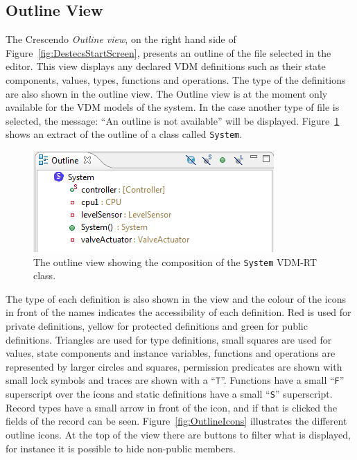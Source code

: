 \documentclass{crescendorepchap}
\begin{document}
\subsection{Outline View}

The Crescendo \emph{Outline view}, on the right hand side of Figure~\ref{fig:DestecsStartScreen}, presents
an outline of the file selected in the editor. This view displays any
declared VDM definitions such as their state components, values, types,
functions and operations. The type of the definitions are also shown in
the outline view. The Outline view is at the moment only available for
the VDM models of the system. In the case another type of file is
selected, the message: ``An outline is not available'' will be displayed. 
Figure~\ref{fig:outlineview} shows an extract of the outline of a class called \texttt{System}. 

\begin{figure}[htbp]
\centering
\includegraphics[width=.6\textwidth]{images/DestecsOutLineViewSystem.png}
\caption{The outline view showing the composition of the \texttt{System}
VDM-RT class.\label{fig:outlineview}}
\end{figure}

The
type of each definition is also shown in the view and the colour of
the icons in front of the names indicates the accessibility of each
definition. Red is
used for private definitions, yellow for protected definitions and
green for public definitions. Triangles are used for
type definitions, small squares are used for values, state components
and instance variables, functions and operations are represented by
larger circles and squares, permission predicates are shown with small
lock symbols and traces are shown with a
``\texttt{T}''. Functions have a small ``\texttt{F}'' superscript over the
icons and static definitions have a small ``\texttt{S}'' superscript.
Record types have a small arrow in front of the
icon, and if that is clicked the fields of the record can be seen.
Figure~\ref{fig:OutlineIcons} illustrates the different outline icons.
At the top of the view there are buttons to filter what is displayed,
for instance it is possible to hide non-public members.
\end{document}
